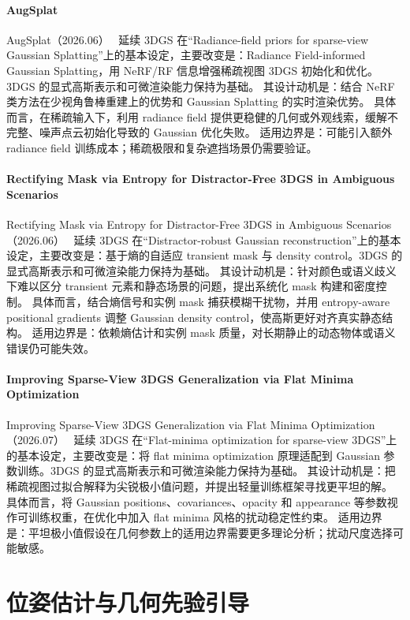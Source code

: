 \paragraph{AugSplat}
AugSplat（2026.06）~\cite{2606_31556} 延续 3DGS 在“Radiance-field priors for sparse-view Gaussian Splatting”上的基本设定，主要改变是：Radiance Field-informed Gaussian Splatting，用 NeRF/RF 信息增强稀疏视图 3DGS 初始化和优化。3DGS 的显式高斯表示和可微渲染能力保持为基础。
其设计动机是：结合 NeRF 类方法在少视角鲁棒重建上的优势和 Gaussian Splatting 的实时渲染优势。
具体而言，在稀疏输入下，利用 radiance field 提供更稳健的几何或外观线索，缓解不完整、噪声点云初始化导致的 Gaussian 优化失败。
适用边界是：可能引入额外 radiance field 训练成本；稀疏极限和复杂遮挡场景仍需要验证。

\paragraph{Rectifying Mask via Entropy for Distractor-Free 3DGS in Ambiguous Scenarios}
Rectifying Mask via Entropy for Distractor-Free 3DGS in Ambiguous Scenarios（2026.06）~\cite{2606_29496} 延续 3DGS 在“Distractor-robust Gaussian reconstruction”上的基本设定，主要改变是：基于熵的自适应 transient mask 与 density control。3DGS 的显式高斯表示和可微渲染能力保持为基础。
其设计动机是：针对颜色或语义歧义下难以区分 transient 元素和静态场景的问题，提出系统化 mask 构建和密度控制。
具体而言，结合熵信号和实例 mask 捕获模糊干扰物，并用 entropy-aware positional gradients 调整 Gaussian density control，使高斯更好对齐真实静态结构。
适用边界是：依赖熵估计和实例 mask 质量，对长期静止的动态物体或语义错误仍可能失效。

\paragraph{Improving Sparse-View 3DGS Generalization via Flat Minima Optimization}
Improving Sparse-View 3DGS Generalization via Flat Minima Optimization（2026.07）~\cite{2607_00885} 延续 3DGS 在“Flat-minima optimization for sparse-view 3DGS”上的基本设定，主要改变是：将 flat minima optimization 原理适配到 Gaussian 参数训练。3DGS 的显式高斯表示和可微渲染能力保持为基础。
其设计动机是：把稀疏视图过拟合解释为尖锐极小值问题，并提出轻量训练框架寻找更平坦的解。
具体而言，将 Gaussian positions、covariances、opacity 和 appearance 等参数视作可训练权重，在优化中加入 flat minima 风格的扰动稳定性约束。
适用边界是：平坦极小值假设在几何参数上的适用边界需要更多理论分析；扰动尺度选择可能敏感。
\section{位姿估计与几何先验引导}
\label{sec:12_pose}


